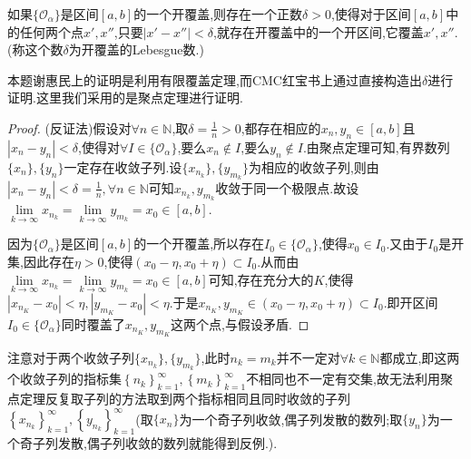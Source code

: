 \documentclass[../../main.tex]{subfiles}%
\begin{document}
\begin{lemma}[Lebesgue数引理]\label{lemma:Lebesgue数引理}
如果\(\{\mathcal{O}_{\alpha}\}\)是区间\([a,b]\)的一个开覆盖,则存在一个正数\(\delta>0\),使得对于区间\([a,b]\)中的任何两个点\(x',x''\),只要\(\vert x' - x''\vert<\delta\),就存在开覆盖中的一个开区间,它覆盖\(x',x''\).(称这个数\(\delta\)为开覆盖的Lebesgue数.)
\end{lemma}
\begin{note}
本题谢惠民上的证明是利用有限覆盖定理,而CMC红宝书上通过直接构造出$\delta$进行证明.这里我们采用的是聚点定理进行证明.
\end{note}
\begin{proof}

(反证法)假设对$\forall n\in\mathbb{N}$,取$\delta=\frac{1}{n}>0$,都存在相应的$x_n,y_n\in [a,b]$且$\left| x_n-y_n \right|<\delta$,使得对$\forall I\in\{\mathcal{O} _{\alpha}\}$,要么$x_n \notin I$,要么$y_n \notin I$.由聚点定理可知,有界数列$\{x_n\},\{y_n\}$一定存在收敛子列.设$\{x_{n_k}\},\{y_{m_k}\}$为相应的收敛子列,则由$\left| x_n-y_n \right|<\delta=\frac{1}{n},\forall n\in \mathbb{N}$可知${x_{n_k}},{y_{m_k}}$收敛于同一个极限点.故设$\underset{k\rightarrow \infty}{\lim}x_{n_k}=\underset{k\rightarrow \infty}{\lim}y_{m_k}=x_0\in[a,b]$.

因为\(\{\mathcal{O}_{\alpha}\}\)是区间\([a,b]\)的一个开覆盖,所以存在$I_0\in \{\mathcal{O}_{\alpha}\}$,使得$x_0 \in I_0$.又由于$I_0$是开集,因此存在$\eta>0$,使得$(x_0-\eta,x_0+\eta)\subset I_0$.从而由$\underset{k\rightarrow \infty}{\lim}x_{n_k}=\underset{k\rightarrow \infty}{\lim}y_{m_k}=x_0\in[a,b]$可知,存在充分大的$K$,使得$\left| x_{n_K}-x_0 \right|<\eta ,\left| y_{m_K}-x_0 \right|<\eta$.于是$x_{n_K},y_{m_K}\in \left( x_0-\eta ,x_0+\eta \right) \subset I_0$.即开区间$I_0\in \{\mathcal{O}_{\alpha}\}$同时覆盖了$x_{n_K},y_{m_K}$这两个点,与假设矛盾.

\end{proof}
\begin{remark}
注意对于两个收敛子列$\{x_{n_k}\},\{y_{m_k}\}$,此时$n_k = m_k$并不一定对$\forall k\in \mathbb{N}$都成立,即这两个收敛子列的指标集$\left\{ n_k \right\} _{k=1}^{\infty},\left\{ m_k \right\} _{k=1}^{\infty}$不相同也不一定有交集,故无法利用聚点定理反复取子列的方法取到两个指标相同且同时收敛的子列$\left\{ x_{n_k} \right\} _{k=1}^{\infty},\left\{ y_{n_k} \right\} _{k=1}^{\infty}$(取$\{x_n\}$为一个奇子列收敛,偶子列发散的数列;取$\{y_n\}$为一个奇子列发散,偶子列收敛的数列就能得到反例.).
\end{remark}
\end{document}
